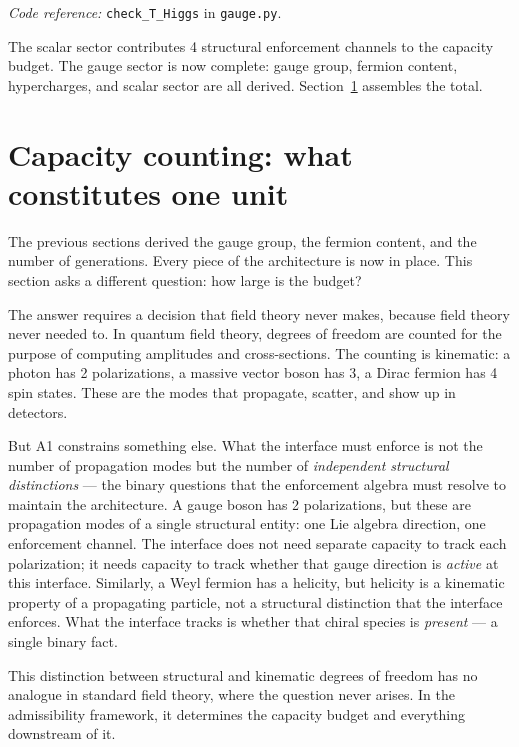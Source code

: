 \documentclass[11pt]{article}
\newcommand{\coderef}[2]{\smallskip\noindent\textit{Code reference:} \texttt{#1} in \texttt{#2}.}
\begin{document}
\coderef{check\_T\_Higgs}{gauge.py}

The scalar sector contributes 4 structural enforcement channels to the capacity budget.  The gauge sector is now complete: gauge group, fermion content, hypercharges, and scalar sector are all derived.  Section~\ref{sec:counting} assembles the total.


\section{Capacity counting: what constitutes one unit}
\label{sec:counting}

The previous sections derived the gauge group, the fermion content, and the number of generations.  Every piece of the architecture is now in place.  This section asks a different question: how large is the budget?

The answer requires a decision that field theory never makes, because field theory never needed to.  In quantum field theory, degrees of freedom are counted for the purpose of computing amplitudes and cross-sections.  The counting is kinematic: a photon has 2 polarizations, a massive vector boson has 3, a Dirac fermion has 4 spin states.  These are the modes that propagate, scatter, and show up in detectors.

But A1 constrains something else.  What the interface must enforce is not the number of propagation modes but the number of \emph{independent structural distinctions} --- the binary questions that the enforcement algebra must resolve to maintain the architecture.  A gauge boson has 2 polarizations, but these are propagation modes of a single structural entity: one Lie algebra direction, one enforcement channel.  The interface does not need separate capacity to track each polarization; it needs capacity to track whether that gauge direction is \emph{active} at this interface.  Similarly, a Weyl fermion has a helicity, but helicity is a kinematic property of a propagating particle, not a structural distinction that the interface enforces.  What the interface tracks is whether that chiral species is \emph{present} --- a single binary fact.

This distinction between structural and kinematic degrees of freedom has no analogue in standard field theory, where the question never arises.  In the admissibility framework, it determines the capacity budget and everything downstream of it.
\end{document}
